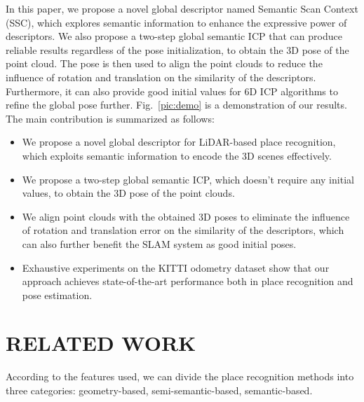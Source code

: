 \documentclass[letterpaper, 10 pt, conference]{ieeeconf}
\begin{document}
In this paper, we propose a novel global descriptor named Semantic Scan Context (SSC), which explores semantic information to enhance the expressive power of descriptors. We also propose a two-step global semantic ICP that can produce reliable results regardless of the pose initialization, to obtain the 3D pose  of the point cloud. The pose is then used to align the point clouds to reduce the influence of rotation and translation on the similarity of the descriptors. Furthermore, it can also provide good initial values for 6D ICP algorithms to refine the global pose further. Fig.~\ref{pic:demo} is a demonstration of our results. The main contribution is summarized as follows:
\begin{itemize}
    \item We propose a novel global descriptor for LiDAR-based place recognition, which exploits semantic information to encode the 3D scenes effectively.
\item We propose a two-step global semantic ICP, which doesn't require any initial values, to obtain the 3D pose  of the point clouds.
    \item We align point clouds with the obtained 3D poses to eliminate the influence of rotation and translation error on the similarity of the descriptors, which can also further benefit the SLAM system as good initial poses.
    \item Exhaustive experiments on the KITTI odometry dataset show that our approach achieves state-of-the-art performance both in place recognition and pose estimation.
\end{itemize}



\section{RELATED WORK}

According to the features used, we can divide the place recognition methods into three categories: geometry-based, semi-semantic-based, semantic-based.
\end{document}
